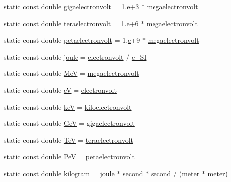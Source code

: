 \begin{DoxyCompactItemize}
static const double \hyperlink{namespacedd4hep_ac36e148fcf16a0ffd9061c13ba225659}{gigaelectronvolt} = 1.\hyperlink{_volumes_8cpp_a8a9a1f93e9b09afccaec215310e64142}{e}+3 $\ast$ \hyperlink{namespacedd4hep_a4e39beba039f7a6bda24a7031c121b2a}{megaelectronvolt}
\item 
static const double \hyperlink{namespacedd4hep_ac482cce1ba221816734b1a3384f958d9}{teraelectronvolt} = 1.\hyperlink{_volumes_8cpp_a8a9a1f93e9b09afccaec215310e64142}{e}+6 $\ast$ \hyperlink{namespacedd4hep_a4e39beba039f7a6bda24a7031c121b2a}{megaelectronvolt}
\item 
static const double \hyperlink{namespacedd4hep_a096cb423758a909c122182a3eed457d1}{petaelectronvolt} = 1.\hyperlink{_volumes_8cpp_a8a9a1f93e9b09afccaec215310e64142}{e}+9 $\ast$ \hyperlink{namespacedd4hep_a4e39beba039f7a6bda24a7031c121b2a}{megaelectronvolt}
\item 
static const double \hyperlink{namespacedd4hep_a8cdc11c61e5f953baede59569544a324}{joule} = \hyperlink{namespacedd4hep_a849fe8dd27af5a22a8d7891687a4d499}{electronvolt} / \hyperlink{namespacedd4hep_a18365e1a8b0f1730924219e336e11e9f}{e\+\_\+\+SI}
\item 
static const double \hyperlink{namespacedd4hep_a6dee62809c6ee54d2fc90671f4dc8b91}{MeV} = \hyperlink{namespacedd4hep_a4e39beba039f7a6bda24a7031c121b2a}{megaelectronvolt}
\item 
static const double \hyperlink{namespacedd4hep_a17b06ecf4141c435b68b9873d0474460}{eV} = \hyperlink{namespacedd4hep_a849fe8dd27af5a22a8d7891687a4d499}{electronvolt}
\item 
static const double \hyperlink{namespacedd4hep_a2b928c9b9d50fa8a9d3f9840f3a5f258}{keV} = \hyperlink{namespacedd4hep_a05014d49c7c5438820adf620633249e7}{kiloelectronvolt}
\item 
static const double \hyperlink{namespacedd4hep_a3b49780cbe455fda1f6b8a58ff555ae5}{GeV} = \hyperlink{namespacedd4hep_ac36e148fcf16a0ffd9061c13ba225659}{gigaelectronvolt}
\item 
static const double \hyperlink{namespacedd4hep_a7c925bf28d6b294f8f120a69deb6fe02}{TeV} = \hyperlink{namespacedd4hep_ac482cce1ba221816734b1a3384f958d9}{teraelectronvolt}
\item 
static const double \hyperlink{namespacedd4hep_ae90286dc351bfa44df11c5ebf9dbdbe9}{PeV} = \hyperlink{namespacedd4hep_a096cb423758a909c122182a3eed457d1}{petaelectronvolt}
\item 
static const double \hyperlink{namespacedd4hep_a94c5d58440a5bf3d43b1edaa51ae5294}{kilogram} = \hyperlink{namespacedd4hep_a8cdc11c61e5f953baede59569544a324}{joule} $\ast$ \hyperlink{namespacedd4hep_ac03364576705a245265d8ed6ea26b871}{second} $\ast$ \hyperlink{namespacedd4hep_ac03364576705a245265d8ed6ea26b871}{second} / (\hyperlink{namespacedd4hep_a46f5cf0231796af4296a307a58812b06}{meter} $\ast$ \hyperlink{namespacedd4hep_a46f5cf0231796af4296a307a58812b06}{meter})

\end{DoxyCompactItemize}
